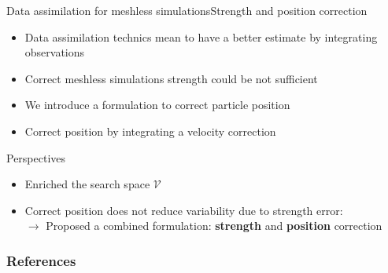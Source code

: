 \documentclass[aspectratio=169]{beamer} %
\begin{document}
\begin{frame}{Data assimilation for meshless simulations}{Strength and position correction}

    \begin{itemize}
        \item Data assimilation technics mean to have a better estimate by integrating observations
        \item Correct meshless simulations strength could be not sufficient
        \item We introduce a formulation to correct particle position
        \item Correct position by integrating a velocity correction
    \end{itemize}

    \begin{block}{Perspectives}
        \begin{itemize}
            \item Enriched the search space $\mathcal V$
            \item Correct position does not reduce variability due to strength error:\\
                  $\rightarrow$ Proposed a combined formulation: \textbf{strength} and \textbf{position} correction
        \end{itemize}
    \end{block}
\end{frame}

\closingframe

\begin{frame}
    \frametitle{References}
    \printbibliography %
\end{frame}

\end{document}
